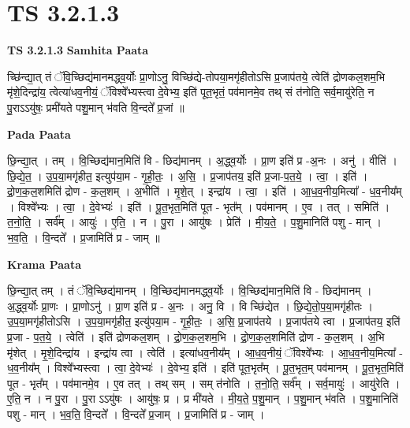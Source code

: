 \documentclass[17pt]{extarticle}
\begin{document}
\section{ TS 3.2.1.3 }

\textbf{TS 3.2.1.3 } \newline
\textbf{Samhita Paata} \newline

च्छि॑न्द्या॒त् तं ॅवि॒च्छिद्य॑मानमद्ध्व॒र्योः प्रा॒णोऽनु॒ विच्छि॑द्ये-तोपया॒मगृ॑हीतोऽसि प्र॒जाप॑तये॒ त्वेति॑ द्रोणकल॒शम॒भि मृ॑शे॒दिन्द्रा॑य॒ त्वेत्या॑धव॒नीयं॒ ॅविश्वे᳚भ्यस्त्वा दे॒वेभ्य॒ इति॑ पूत॒भृतं॒ पव॑मानमे॒व तथ् सं त॑नोति॒ सर्व॒मायु॑रेति॒ न पु॒राऽऽयु॑षः॒ प्रमी॑यते पशु॒मान् भ॑वति वि॒न्दते᳚ प्र॒जां ॥ \newline

\textbf{Pada Paata} \newline

छि॒न्द्या॒त् । तम् । वि॒च्छिद्य॑मान॒मिति॑ वि - छिद्य॑मानम् । अ॒द्ध्व॒र्योः । प्रा॒ण इति॑ प्र -अ॒नः । अनु॑ । वीति॑ । छि॒द्ये॒त॒ । उ॒प॒या॒मगृ॑हीत॒ इत्युप॑या॒म - गृ॒ही॒तः॒ । अ॒सि॒ । प्र॒जाप॑तय॒ इति॑ प्र॒जा-प॒त॒ये॒ । त्वा॒ । इति॑ । द्रो॒ण॒क॒ल॒शमिति॑ द्रोण - क॒ल॒शम् । अ॒भीति॑ । मृ॒शे॒त् । इन्द्रा॑य । त्वा॒ । इति॑ । आ॒ध॒व॒नीय॒मित्या᳚ - ध॒व॒नीय᳚म् । विश्वे᳚भ्यः । त्वा॒ । दे॒वेभ्यः॑ । इति॑ । पू॒त॒भृत॒मिति॑ पूत - भृत᳚म् । पव॑मानम् । ए॒व । तत् । समिति॑ । त॒नो॒ति॒ । सर्व᳚म् । आयुः॑ । ए॒ति॒ । न । पु॒रा । आयु॑षः । प्रेति॑ । मी॒य॒ते॒ । प॒शु॒मानिति॑ पशु - मान् । भ॒व॒ति॒ । वि॒न्दते᳚ । प्र॒जामिति॑ प्र - जाम् ॥  \newline


\textbf{Krama Paata} \newline

छि॒न्द्या॒त् तम् । तं ॅवि॒च्छिद्य॑मानम् । वि॒च्छिद्य॑मानमद्ध्व॒र्योः । वि॒च्छिद्य॑मान॒मिति॑ वि - छिद्य॑मानम् । अ॒द्ध्व॒र्योः प्रा॒णः । प्रा॒णोऽनु॑ । प्रा॒ण इति॑ प्र - अ॒नः । अनु॒ वि । वि च्छि॑द्येत । छि॒द्ये॒तो॒प॒या॒मगृ॑हीतः । उ॒प॒या॒मगृ॑हीतोऽसि । उ॒प॒या॒मगृ॑हीत॒ इत्यु॑पया॒म - गृ॒ही॒तः॒ । अ॒सि॒ प्र॒जाप॑तये । प्र॒जाप॑तये त्वा । प्र॒जाप॑तय॒ इति॑ प्र॒जा - प॒त॒ये॒ । त्वेति॑ । इति॑ द्रोणकल॒शम् । द्रो॒ण॒क॒ल॒शम॒भि । द्रो॒ण॒क॒ल॒शमिति॑ द्रोण - क॒ल॒शम् । अ॒भि मृ॑शेत् । मृ॒शे॒दिन्द्रा॑य । इन्द्रा॑य त्वा । त्वेति॑ । इत्या॑धव॒नीय᳚म् । आ॒ध॒व॒नीयं॒ ॅविश्वे᳚भ्यः । आ॒ध॒व॒नीय॒मित्या᳚ - ध॒व॒नीय᳚म् । विश्वे᳚भ्यस्त्वा । त्वा॒ दे॒वेभ्यः॑ । दे॒वेभ्य॒ इति॑ । इति॑ पूत॒भृत᳚म् । पू॒त॒भृत॒म् पव॑मानम् । पू॒त॒भृत॒मिति॑ पूत - भृत᳚म् । पव॑मानमे॒व । ए॒व तत् । तथ् सम् । सम् त॑नोति । त॒नो॒ति॒ सर्व᳚म् । सर्व॒मायुः॑ । आयु॑रेति । ए॒ति॒ न । न पु॒रा । 
पु॒रा ऽऽयु॑षः । आयु॑षः॒ प्र । प्र मी॑यते । मी॒य॒ते॒ प॒शु॒मान् । प॒शु॒मान् भ॑वति । प॒शु॒मानिति॑ पशु - मान् । भ॒व॒ति॒ वि॒न्दते᳚ । वि॒न्दते᳚ प्र॒जाम् । प्र॒जामिति॑ प्र - जाम् । \newline
\end{document}
